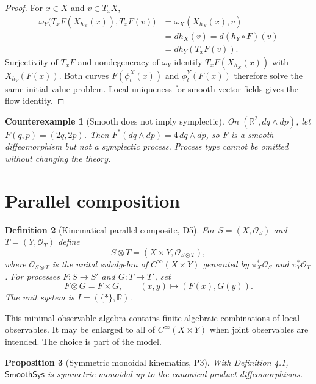 \documentclass[11pt]{article}
\newtheorem{definition}{Definition}[section]
\newtheorem{proposition}[definition]{Proposition}
\newtheorem{counterexample}[definition]{Counterexample}
\newcommand{\R}{\mathbb{R}}
\newcommand{\Obs}{\mathcal{O}}
\newcommand{\Smooth}{\mathsf{SmoothSys}}
\begin{document}
\begin{proof}
For $x\in X$ and $v\in T_xX$,
\begin{align*}
 \omega_Y\bigl(T_xF(X_{h_X}(x)),T_xF(v)\bigr)
 &=\omega_X(X_{h_X}(x),v)\\
 &=dh_X(v)=d(h_Y\circ F)(v)\\
 &=dh_Y(T_xF(v)).
\end{align*}
Surjectivity of $T_xF$ and nondegeneracy of $\omega_Y$ identify $T_xF(X_{h_X}(x))$ with $X_{h_Y}(F(x))$. Both curves $F(\phi_t^X(x))$ and $\phi_t^Y(F(x))$ therefore solve the same initial-value problem. Local uniqueness for smooth vector fields gives the flow identity.
\end{proof}

\begin{counterexample}[Smooth does not imply symplectic]
On $(\R^2,dq\wedge dp)$, let $F(q,p)=(2q,2p)$. Then
$F^*(dq\wedge dp)=4\,dq\wedge dp$, so $F$ is a smooth diffeomorphism but not a symplectic process. Process type cannot be omitted without changing the theory.
\end{counterexample}

\section{Parallel composition}

\begin{definition}[Kinematical parallel composite, D5]
For $S=(X,\Obs_S)$ and $T=(Y,\Obs_T)$ define
\[
 S\otimes T=(X\times Y,\Obs_{S\otimes T}),
\]
where $\Obs_{S\otimes T}$ is the unital subalgebra of $C^\infty(X\times Y)$ generated by $\pi_X^*\Obs_S$ and $\pi_Y^*\Obs_T$. For processes $F:S\to S'$ and $G:T\to T'$, set
\[
 F\otimes G=F\times G,\qquad (x,y)\mapsto(F(x),G(y)).
\]
The unit system is $I=(\{*\},\R)$.
\end{definition}

This minimal observable algebra contains finite algebraic combinations of local observables. It may be enlarged to all of $C^\infty(X\times Y)$ when joint observables are intended. The choice is part of the model.

\begin{proposition}[Symmetric monoidal kinematics, P3]
With Definition 4.1, $\Smooth$ is symmetric monoidal up to the canonical product diffeomorphisms.
\end{proposition}
\end{document}
